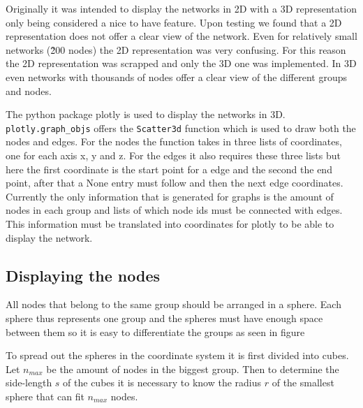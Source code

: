 Originally it was intended to display the networks in 2D with a 3D representation only being considered a nice to have feature. Upon testing we found that a 2D representation does not offer a clear view of the network. Even for relatively small networks (\~200 nodes) the 2D representation was very confusing. For this reason the 2D representation was scrapped and only the 3D one was implemented. In 3D even networks with thousands of nodes offer a clear view of the different groups and nodes.
\newline

The python package plotly \cite{plotly} is used to display the networks in 3D. \texttt{plotly.graph\_objs} offers the \texttt{Scatter3d} function which is used to draw both the nodes and edges. For the nodes the function takes in three lists of coordinates, one for each axis x, y and z. For the edges it also requires these three lists but here the first coordinate is the start point for a edge and the second the end point, after that a None entry must follow and then the next edge coordinates. Currently the only information that is generated for graphs is the amount of nodes in each group and lists of which node ids must be connected with edges. This information must be translated into coordinates for plotly to be able to display the network.

\subsection{Displaying the nodes}
\label{sub:displayNodes}
All nodes that belong to the same group should be arranged in a sphere. Each sphere thus represents one group and the spheres must have enough space between them so it is easy to differentiate the groups as seen in figure %

To spread out the spheres in the coordinate system it is first divided into cubes. Let $n_{max}$ be the amount of nodes in the biggest group. Then to determine the side-length $s$ of the cubes it is necessary to know the radius $r$ of the smallest sphere that can fit $n_{max}$ nodes.

